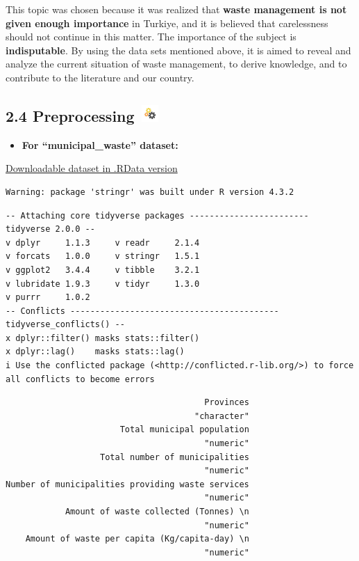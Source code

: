 \documentclass[
  11pt,
  a4paper,
  DIV=11,
  numbers=noendperiod]{scrartcl}
\providecommand{\tightlist}{%
  \setlength{\itemsep}{0pt}\setlength{\parskip}{0pt}}\usepackage{longtable,booktabs,array}
\begin{document}
This topic was chosen because it was realized that \textbf{waste
management is not given enough importance} in Turkiye, and it is
believed that carelessness should not continue in this matter. The
importance of the subject is \textbf{indisputable}. By using the data
sets mentioned above, it is aimed to reveal and analyze the current
situation of waste management, to derive knowledge, and to contribute to
the literature and our country.

\subsection[{2.4 Preprocessing} ]{\texorpdfstring{{2.4 Preprocessing}
\protect\includegraphics[width=0.30208in,height=0.25in]{assets/images/preprocess.jpg}}{2.4 Preprocessing }}\label{preprocessing}

\begin{itemize}
\tightlist
\item
  \textbf{For ``municipal\_waste'' dataset:}
\end{itemize}

\href{https://github.com/emu-hacettepe-analytics/emu660-spring2024-Dilara-pro/tree/main/project/data}{Downloadable
dataset in .RData version}

\begin{verbatim}
Warning: package 'stringr' was built under R version 4.3.2
\end{verbatim}

\begin{verbatim}
-- Attaching core tidyverse packages ------------------------ tidyverse 2.0.0 --
v dplyr     1.1.3     v readr     2.1.4
v forcats   1.0.0     v stringr   1.5.1
v ggplot2   3.4.4     v tibble    3.2.1
v lubridate 1.9.3     v tidyr     1.3.0
v purrr     1.0.2     
-- Conflicts ------------------------------------------ tidyverse_conflicts() --
x dplyr::filter() masks stats::filter()
x dplyr::lag()    masks stats::lag()
i Use the conflicted package (<http://conflicted.r-lib.org/>) to force all conflicts to become errors
\end{verbatim}

\begin{verbatim}
                                        Provinces 
                                      "character" 
                       Total municipal population 
                                        "numeric" 
                   Total number of municipalities 
                                        "numeric" 
Number of municipalities providing waste services 
                                        "numeric" 
            Amount of waste collected (Tonnes) \n 
                                        "numeric" 
    Amount of waste per capita (Kg/capita-day) \n 
                                        "numeric" 
\end{verbatim}
\end{document}
